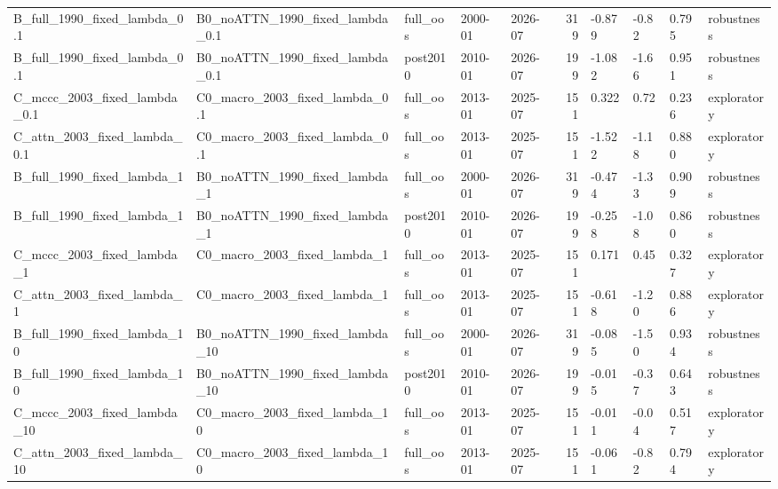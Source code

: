 \begin{table}
\begin{tabular}{lllllrllll}
B\_full\_1990\_fixed\_lambda\_0.1 & B0\_noATTN\_1990\_fixed\_lambda\_0.1 & full\_oos & 2000-01 & 2026-07 & 319 & -0.879 & -0.82 & 0.795 & robustness \\
B\_full\_1990\_fixed\_lambda\_0.1 & B0\_noATTN\_1990\_fixed\_lambda\_0.1 & post2010 & 2010-01 & 2026-07 & 199 & -1.082 & -1.66 & 0.951 & robustness \\
C\_mccc\_2003\_fixed\_lambda\_0.1 & C0\_macro\_2003\_fixed\_lambda\_0.1 & full\_oos & 2013-01 & 2025-07 & 151 & 0.322 & 0.72 & 0.236 & exploratory \\
C\_attn\_2003\_fixed\_lambda\_0.1 & C0\_macro\_2003\_fixed\_lambda\_0.1 & full\_oos & 2013-01 & 2025-07 & 151 & -1.522 & -1.18 & 0.880 & exploratory \\
B\_full\_1990\_fixed\_lambda\_1 & B0\_noATTN\_1990\_fixed\_lambda\_1 & full\_oos & 2000-01 & 2026-07 & 319 & -0.474 & -1.33 & 0.909 & robustness \\
B\_full\_1990\_fixed\_lambda\_1 & B0\_noATTN\_1990\_fixed\_lambda\_1 & post2010 & 2010-01 & 2026-07 & 199 & -0.258 & -1.08 & 0.860 & robustness \\
C\_mccc\_2003\_fixed\_lambda\_1 & C0\_macro\_2003\_fixed\_lambda\_1 & full\_oos & 2013-01 & 2025-07 & 151 & 0.171 & 0.45 & 0.327 & exploratory \\
C\_attn\_2003\_fixed\_lambda\_1 & C0\_macro\_2003\_fixed\_lambda\_1 & full\_oos & 2013-01 & 2025-07 & 151 & -0.618 & -1.20 & 0.886 & exploratory \\
B\_full\_1990\_fixed\_lambda\_10 & B0\_noATTN\_1990\_fixed\_lambda\_10 & full\_oos & 2000-01 & 2026-07 & 319 & -0.085 & -1.50 & 0.934 & robustness \\
B\_full\_1990\_fixed\_lambda\_10 & B0\_noATTN\_1990\_fixed\_lambda\_10 & post2010 & 2010-01 & 2026-07 & 199 & -0.015 & -0.37 & 0.643 & robustness \\
C\_mccc\_2003\_fixed\_lambda\_10 & C0\_macro\_2003\_fixed\_lambda\_10 & full\_oos & 2013-01 & 2025-07 & 151 & -0.011 & -0.04 & 0.517 & exploratory \\
C\_attn\_2003\_fixed\_lambda\_10 & C0\_macro\_2003\_fixed\_lambda\_10 & full\_oos & 2013-01 & 2025-07 & 151 & -0.061 & -0.82 & 0.794 & exploratory \\
\bottomrule
\end{tabular}
\end{table}
